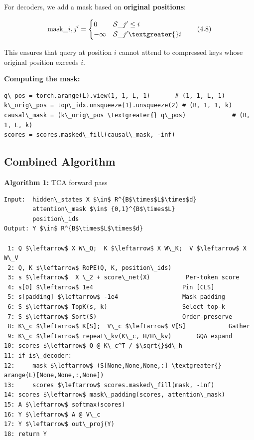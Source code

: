 For decoders, we add a mask based on \textbf{original positions}:

\[
\text{mask}\_{i, j'} = \begin{cases} 0 & \mathcal{S}\_{j'} \leq i \\ -\infty & \mathcal{S}\_{j'} \textgreater{} i \end{cases}
\tag{4.8}
\]

This ensures that query at position $i$ cannot attend to compressed keys 
whose original position exceeds $i$.

\textbf{Computing the mask:}

\begin{lstlisting}
q\_pos = torch.arange(L).view(1, 1, L, 1)       # (1, 1, L, 1)
k\_orig\_pos = top\_idx.unsqueeze(1).unsqueeze(2) # (B, 1, 1, k)
causal\_mask = (k\_orig\_pos \textgreater{} q\_pos)             # (B, 1, L, k)
scores = scores.masked\_fill(causal\_mask, -inf)
\end{lstlisting}

\subsection{Combined Algorithm}

\textbf{Algorithm 1:} TCA forward pass
\begin{lstlisting}
Input:  hidden\_states X $\in$ R^{B$\times$L$\times$d}
        attention\_mask $\in$ {0,1}^{B$\times$L}
        position\_ids
Output: Y $\in$ R^{B$\times$L$\times$d}

 1: Q $\leftarrow$ X W\_Q;  K $\leftarrow$ X W\_K;  V $\leftarrow$ X W\_V
 2: Q, K $\leftarrow$ RoPE(Q, K, position\_ids)
 3: s $\leftarrow$  X \_2 + score\_net(X)          Per-token score
 4: s[0] $\leftarrow$ 1e4                         Pin [CLS]
 5: s[padding] $\leftarrow$ -1e4                  Mask padding
 6: S $\leftarrow$ TopK(s, k)                     Select top-k
 7: S $\leftarrow$ Sort(S)                        Order-preserve
 8: K\_c $\leftarrow$ K[S];  V\_c $\leftarrow$ V[S]            Gather
 9: K\_c $\leftarrow$ repeat\_kv(K\_c, H/H\_kv)       GQA expand
10: scores $\leftarrow$ Q @ K\_c^T / $\sqrt{}$d\_h
11: if is\_decoder:
12:     mask $\leftarrow$ (S[None,None,None,:] \textgreater{} arange(L)[None,None,:,None])
13:     scores $\leftarrow$ scores.masked\_fill(mask, -inf)
14: scores $\leftarrow$ mask\_padding(scores, attention\_mask)
15: A $\leftarrow$ softmax(scores)
16: Y $\leftarrow$ A @ V\_c
17: Y $\leftarrow$ out\_proj(Y)
18: return Y
\end{lstlisting}

